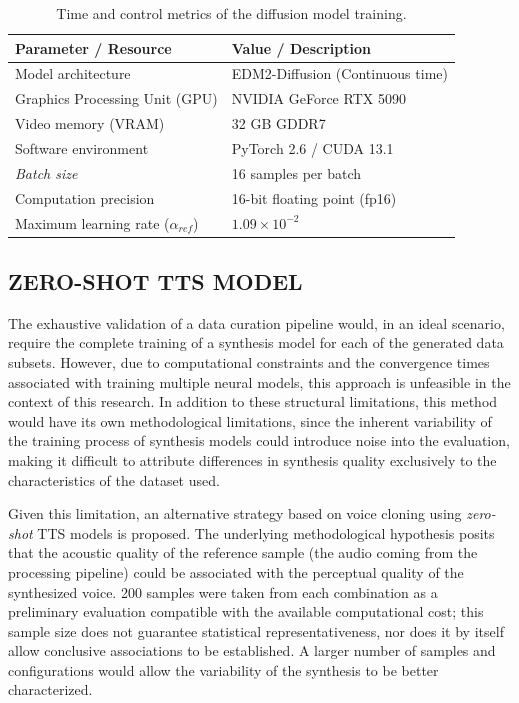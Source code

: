 \begin{table}[htbp]
\centering
\caption{Time and control metrics of the diffusion model training.}
\label{tab:especificaciones_entrenamiento}
\begin{tabular}{@{}ll@{}}
\toprule
\textbf{Parameter / Resource}           & \textbf{Value / Description} \\ \midrule
Model architecture                & EDM2-Diffusion (Continuous time) \\
Graphics Processing Unit (GPU)  & NVIDIA GeForce RTX 5090 \\
Video memory (VRAM)                & 32 GB GDDR7 \\
Software environment                    & PyTorch 2.6 / CUDA 13.1 \\
\textit{Batch size}               & 16 samples per batch \\
Computation precision                  & 16-bit floating point (fp16) \\
Maximum learning rate ($\alpha_{ref}$) & $1.09 \times 10^{-2}$ \\
\end{tabular}
\end{table}


\subsection{ZERO-SHOT TTS MODEL}
The exhaustive validation of a data curation pipeline would, in an ideal scenario, require the complete training of a synthesis model for each of the generated data subsets. However, due to computational constraints and the convergence times associated with training multiple neural models, this approach is unfeasible in the context of this research. In addition to these structural limitations, this method would have its own methodological limitations, since the inherent variability of the training process of synthesis models could introduce noise into the evaluation, making it difficult to attribute differences in synthesis quality exclusively to the characteristics of the dataset used.

Given this limitation, an alternative strategy based on voice cloning using \textit{zero-shot} TTS models is proposed. The underlying methodological hypothesis posits that the acoustic quality of the reference sample (the audio coming from the processing pipeline) could be associated with the perceptual quality of the synthesized voice. 200 samples were taken from each combination as a preliminary evaluation compatible with the available computational cost; this sample size does not guarantee statistical representativeness, nor does it by itself allow conclusive associations to be established. A larger number of samples and configurations would allow the variability of the synthesis to be better characterized.

